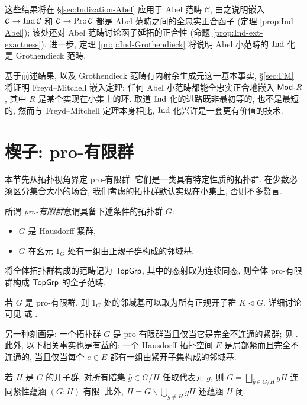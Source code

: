 这些结果将在 \S\ref{sec:Indization-Abel} 应用于 Abel 范畴 $\mathcal{C}$, 由之说明嵌入 $\mathcal{C} \to \operatorname{Ind}\mathcal{C}$ 和 $\mathcal{C} \to \operatorname{Pro}\mathcal{C}$ 都是 Abel 范畴之间的全忠实正合函子 (定理 \ref{prop:Ind-Abel}); 该处还对 Abel 范畴讨论函子延拓的正合性 (命题 \ref{prop:Ind-ext-exactness}). 进一步, 定理 \ref{prop:Ind-Grothendieck} 将说明 Abel 小范畴的 $\operatorname{Ind}$ 化是 Grothendieck 范畴.

基于前述结果, 以及 Grothendieck 范畴有内射余生成元这一基本事实, \S\ref{sec:FM} 将证明 Freyd--Mitchell 嵌入定理: 任何 Abel 小范畴都能全忠实正合地嵌入 $\mathsf{Mod}\text{-}R$, 其中 $R$ 是某个实现在小集上的环. 取道 $\operatorname{Ind}$ 化的进路既非最初等的, 也不是最短的, 然而与 Freyd--Mitchell 定理本身相比, $\operatorname{Ind}$ 化兴许是一套更有价值的技术.

\section{楔子: pro-有限群}\label{sec:profinite-groups}
本节先从拓扑视角界定 pro-有限群: 它们是一类具有特定性质的拓扑群. 在少数必须区分集合大小的场合, 我们考虑的拓扑群默认实现在小集上, 否则不多赘言.

\begin{definition}\label{def:profinite-group}
	所谓 \emph{pro-有限群}意谓具备下述条件的拓扑群 $G$:
	\begin{itemize}
		\item $G$ 是 Hausdorff 紧群,
		\item $G$ 在幺元 $1_G$ 处有一组由正规子群构成的邻域基.
	\end{itemize}
	
	将全体拓扑群构成的范畴记为 $\mathsf{TopGrp}$, 其中的态射取为连续同态, 则全体 pro-有限群构成 $\mathsf{TopGrp}$ 的全子范畴. 
\end{definition}

若 $G$ 是 pro-有限群, 则 $1_G$ 处的邻域基可以取为所有正规开子群 $K \lhd G$. 详细讨论可见 \cite[\S 1.9]{FL14} 或 \cite[\S 4.10]{Li1}.

\begin{remark}
	另一种刻画是: 一个拓扑群 $G$ 是 pro-有限群当且仅当它是完全不连通的紧群; 见 \cite[\S 1.7 和命题 1.9.3]{FL14}. 此外, 以下相关事实也是有益的: 一个 Hausdorff 拓扑空间 $E$ 是局部紧而且完全不连通的, 当且仅当每个 $e \in E$ 都有一组由紧开子集构成的邻域基.
\end{remark}

若 $H$ 是 $G$ 的开子群, 对所有陪集 $\bar{g} \in G/H$ 任取代表元 $g$, 则 $G = \bigsqcup_{\bar{g} \in G/H} gH$ 连同紧性蕴涵 $(G:H)$ 有限. 此外, $H = G \smallsetminus \bigcup_{\bar{g} \neq H} gH$ 还蕴涵 $H$ 闭.

